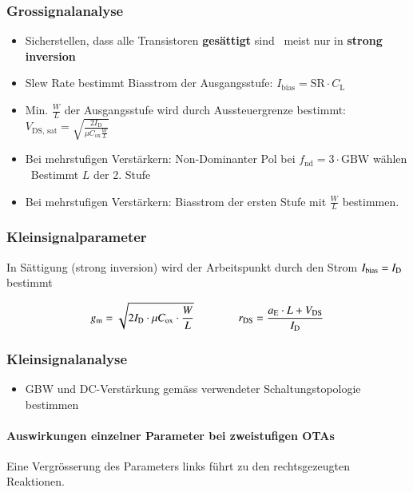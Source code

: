 \subsubsection{Grossignalanalyse}

\begin{itemize}
    \item Sicherstellen, dass alle Transistoren \textbf{gesättigt} sind \textrightarrow\ meist nur in \textbf{strong inversion}
    \item Slew Rate bestimmt Biasstrom der Ausgangsstufe: $I_\text{bias} = \text{SR} \cdot C_\text{L}$
    \item Min. $\frac{W}{L}$ der Ausgangsstufe wird durch Aussteuergrenze bestimmt: $V_\text{DS, sat} = \sqrt{\frac{2 I_\text{D}}{\mu C_\text{ox} \frac{W}{L}}}$
    \item Bei mehrstufigen Verstärkern: Non-Dominanter Pol bei $f_\text{nd} = 3 \cdot \text{GBW}$ wählen \\
        \textrightarrow\ Bestimmt $L$ der 2. Stufe
    \item Bei mehrstufigen Verstärkern: Biasstrom der ersten Stufe mit $\frac{W}{L}$ bestimmen.
\end{itemize}


\subsubsection{Kleinsignalparameter}

In Sättigung (strong inversion) wird der Arbeitspunkt durch den Strom $I_{\text{bias}} = I_{\rm D}$ bestimmt

\vspace{-0.1cm}

\[
    g_{\rm m} = \sqrt{2 I_\text{D} \cdot \mu C_\text{ox} \cdot \frac{W}{L}} \qquad \qquad
    r_{\rm DS} = \frac{a_{\rm E} \cdot L + V_\text{DS}}{I_\text{D}}
\]


\subsubsection{Kleinsignalanalyse}

\begin{itemize}
    \item GBW und DC-Verstärkung gemäss verwendeter Schaltungstopologie bestimmen
\end{itemize}

\smallskip

\paragraph{Auswirkungen einzelner Parameter bei zweistufigen OTAs}
Eine Vergrösserung des Parameters links führt zu den rechtsgezeugten Reaktionen.


